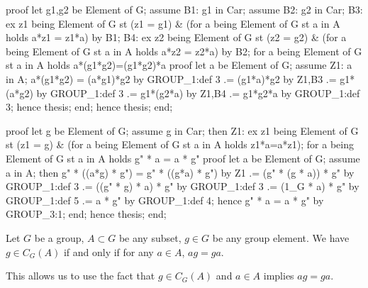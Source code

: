 \nwenddocs{}\endmoddef\nwstartdeflinemarkup{}\nwenddeflinemarkup
proof
  let g1,g2 be Element of G;
  assume B1: g1 in Car;
  assume B2: g2 in Car;
  B3: ex z1 being Element of G st (z1 = g1) & (for a being Element of G
  st a in A holds a*z1 = z1*a) by B1;
  B4: ex z2 being Element of G st (z2 = g2) & (for a being Element of G
  st a in A holds a*z2 = z2*a) by B2;
  for a being Element of G st a in A holds a*(g1*g2)=(g1*g2)*a
  proof
    let a be Element of G;
    assume Z1: a in A;
    a*(g1*g2) = (a*g1)*g2 by GROUP_1:def 3
             .= (g1*a)*g2 by Z1,B3
             .= g1*(a*g2) by GROUP_1:def 3
             .= g1*(g2*a) by Z1,B4
             .= g1*g2*a by GROUP_1:def 3;
    hence thesis;
  end;
  hence thesis;
end;
\nwendcode{}\nwdocspar

\nwenddocs{}\endmoddef\nwstartdeflinemarkup{}\nwenddeflinemarkup
proof
  let g be Element of G;
  assume g in Car;
  then Z1: ex z1 being Element of G st (z1 = g) & (for a being
  Element of G st a in A holds z1*a=a*z1);
  for a being Element of G st a in A holds g" * a = a * g"
  proof
    let a be Element of G;
    assume a in A;
    then g" * ((a*g) * g") = g" * ((g*a) * g") by Z1
                          .= (g" * (g * a)) * g" by GROUP_1:def 3
                          .= ((g" * g) * a) * g"  by GROUP_1:def 3
                          .= (1_G * a) * g"  by GROUP_1:def 5
                          .= a * g"  by GROUP_1:def 4;
    hence g" * a = a * g" by GROUP_3:1;
  end;
  hence thesis;
end;
\nwendcode{}\nwdocspar

\begin{theorem}
Let $G$ be a group, $A\subset G$ be any subset, $g\in G$ be any group element.
We have $g\in C_{G}(A)$ if and only if for any $a\in A$, $ag=ga$.
\end{theorem}

\begin{thm-remark}
This allows us to use the fact that $g\in C_{G}(A)$ and $a\in A$ implies
$ag=ga$.
\end{thm-remark}

